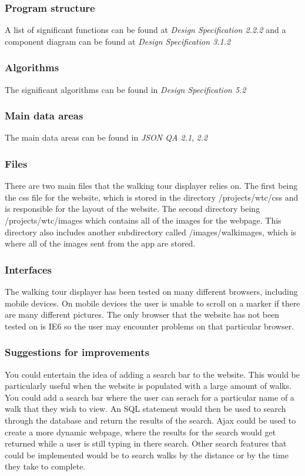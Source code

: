 \documentclass{project}
\begin{document}
\subsubsection{Program structure}
A list of significant functions can be found at \textit{Design Specification 2.2.2} and a component diagram can be found at \textit{Design Specification 3.1.2}

\subsubsection{Algorithms}
The significant algorithms can be found in \textit{Design Specification 5.2}

\subsubsection{Main data areas}
The main data areas can be found in \textit{JSON QA 2.1}, \textit{2.2}

\subsubsection{Files}
There are two main files that the walking tour displayer relies on. The first being the css file for the website, which is stored in the directory /projects/wtc/css and is responsible for the layout of the website. The second directory being /projects/wtc/images which contains all of the images for the webpage. This directory also includes another subdirectory called /images/walkimages, which is where all of the images sent from the app are stored.

\subsubsection{Interfaces}
The walking tour displayer has been tested on many different browsers, including mobile devices. On mobile devices the user is unable to scroll on a marker if there are many different pictures. The only browser that the website has not been tested on is IE6 so the user may encounter problems on that particular browser.


\subsubsection{Suggestions for improvements}
You could entertain the idea of adding a search bar to the website. This would be particularly useful when the website is populated with a large amount of  walks. You could add a search bar where the user can serach for a particular name of a walk that they wish to view. An SQL statement would then be used to search through the database and return the results of the search. Ajax could be used to create a more dynamic webpage, where the results for the search would get returned while a user is still typing in there search. Other search features that could be implemented would be to search walks by the distance or by the time they take to complete.
\end{document}
